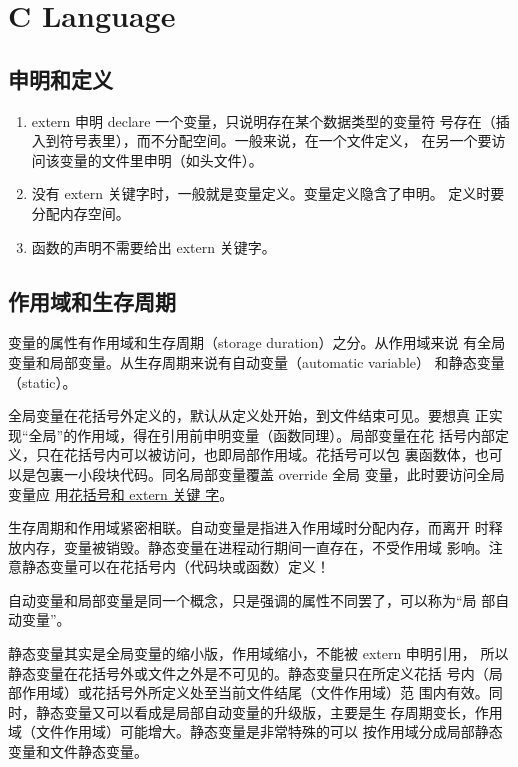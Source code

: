 \chapter{C Language}
\label{cha:c-language}

\section{申明和定义}

\begin{enumerate}
\item extern 申明 declare 一个变量，只说明存在某个数据类型的变量符
  号存在（插入到符号表里），而不分配空间。一般来说，在一个文件定义，
  在另一个要访问该变量的文件里申明（如头文件）。
\item 没有 extern 关键字时，一般就是变量定义。变量定义隐含了申明。
  定义时要分配内存空间。
\item 函数的声明不需要给出 extern 关键字。
\end{enumerate}

\section{作用域和生存周期}

变量的属性有作用域和生存周期（storage duration）之分。从作用域来说
有全局变量和局部变量。从生存周期来说有自动变量（automatic variable）
和静态变量（static）。

全局变量在花括号外定义的，默认从定义处开始，到文件结束可见。要想真
正实现“全局”的作用域，得在引用前申明变量（函数同理）。局部变量在花
括号内部定义，只在花括号内可以被访问，也即局部作用域。花括号可以包
裏函数体，也可以是包裏一小段块代码。同名局部变量覆盖 override 全局
变量，此时要访问全局变量应
用\href{https://stackoverflow.com/a/12183931}{花括号和 extern 关键
  字}。

生存周期和作用域紧密相联。自动变量是指进入作用域时分配内存，而离开
时释放内存，变量被销毁。静态变量在进程动行期间一直存在，不受作用域
影响。注意静态变量可以在花括号内（代码块或函数）定义！

自动变量和局部变量是同一个概念，只是强调的属性不同罢了，可以称为“局
部自动变量”。

静态变量其实是全局变量的缩小版，作用域缩小，不能被 extern 申明引用，
所以静态变量在花括号外或文件之外是不可见的。静态变量只在所定义花括
号内（局部作用域）或花括号外所定义处至当前文件结尾（文件作用域）范
围内有效。同时，静态变量又可以看成是局部自动变量的升级版，主要是生
存周期变长，作用域（文件作用域）可能增大。静态变量是非常特殊的可以
按作用域分成局部静态变量和文件静态变量。

